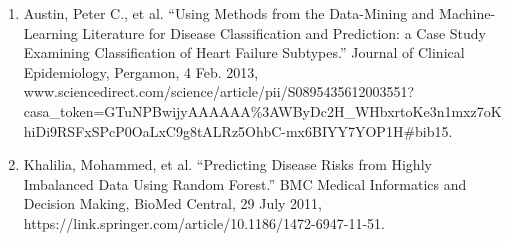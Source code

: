 \documentclass[12pt]{article}
\begin{document}
\begin{enumerate}
    \item Austin, Peter C., et al. “Using Methods from the Data-Mining and Machine-Learning Literature for Disease Classification and Prediction: a Case Study Examining Classification of Heart Failure Subtypes.” Journal of Clinical Epidemiology, Pergamon, 4 Feb. 2013, \\ www.sciencedirect.com/science/article/pii/S0895435612003551?casa\_token=GTuNPBwijyAAAAAA\%3AWByDc2H\_WHbxrtoKe3n1mxz7oKhiDi9RSFxSPcP0OaLxC9g8tALRz5OhbC-mx6BIYY7YOP1H\#bib15.
    \item Khalilia, Mohammed, et al. “Predicting Disease Risks from Highly Imbalanced Data Using Random Forest.” BMC Medical Informatics and Decision Making, BioMed Central, 29 July 2011, https://link.springer.com/article/10.1186/1472-6947-11-51.
\end{enumerate}
\end{document}
